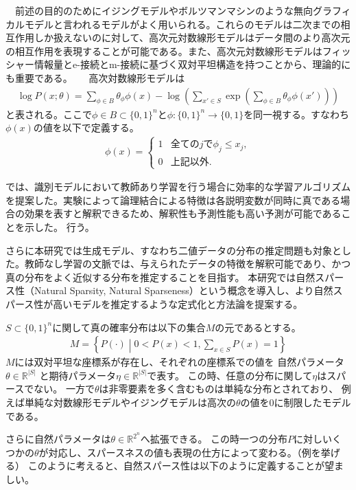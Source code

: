 　前述の目的のためにイジングモデルやボルツマンマシンのような無向グラフィカルモデルと言われるモデルがよく用いられる。これらのモデルは二次までの相互作用しか扱えないのに対して、高次元対数線形モデルはデータ間のより高次元の相互作用を表現することが可能である。また、高次元対数線形モデルはフィッシャー情報量とe-接続とm-接続に基づく双対平坦構造を持つことから、理論的にも重要である。
　
高次対数線形モデルは
\begin{align*}
    \log P(x;\theta) = \sum_{\phi\in B} \theta_\phi \phi(x)  - \log\left( \sum_{x'\in S} \exp\left( \sum_{\phi\in B} \theta_\phi \phi(x') \right) \right)    
\end{align*}
と表される。ここで$\phi \in B \subset \{0,1\}^n$と$\phi:\{0,1\}^n\to \{0,1\} $を同一視する。すなわち$\phi(x)$の値を以下で定義する。
\begin{align*}
    \phi(x)  = \begin{cases}
    1 & 全ての j で　\phi_j \le x_j, \\
    0 & 上記以外.
    \end{cases}
\end{align*}

\cite{LMY01}では、識別モデルにおいて教師あり学習を行う場合に効率的な学習アルゴリズムを提案した。実験によって論理結合による特徴は各説明変数が同時に真である場合の効果を表すと解釈できるため、解釈性も予測性能も高い予測が可能であることを示した。
行う。

さらに本研究では生成モデル、すなわち二値データの分布の推定問題も対象とした。教師なし学習の文脈では、与えられたデータの特徴を解釈可能であり、かつ真の分布をよく近似する分布を推定することを目指す。
本研究では自然スパース性（Natural Sparsity, Natural Sparseness）という概念を導入し、より自然スパース性が高いモデルを推定するような定式化と方法論を提案する。

$S\subset\{0,1\}^n$に関して真の確率分布は以下の集合$M$の元であるとする。
\begin{align*}
    M = \left\{ P(\cdot)\middle| 0<P(x)<1, \sum_{x\in S} P(x) = 1 \right\}
\end{align*}
$M$には双対平坦な座標系が存在し、それぞれの座標系での値を
自然パラメータ$\theta \in \mathbb{R}^{|S|}$
と期待パラメータ$\eta \in \mathbb{R}^{|S|}$で表す。
この時、任意の分布に関して$\eta$はスパースでない。
一方で$\theta$は非零要素を多く含むものは単純な分布とされており、
例えば単純な対数線形モデルやイジングモデルは高次の$\theta$の値を0に制限したモデルである。

さらに自然パラメータは$\theta \in \mathbb{R}^{2^n}$へ拡張できる。
この時一つの分布$P$に対しいくつかの$\theta$が対応し、スパースネスの値も表現の仕方によって変わる。（例を挙げる）
このように考えると、自然スパース性は以下のように定義することが望ましい。

